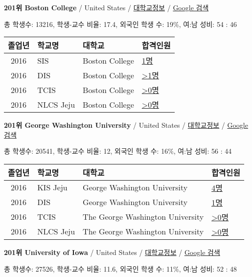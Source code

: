 \documentclass[13pt,]{article}
\begin{document}
\textbf{201위 Boston College} / United States /
\href{https://www.timeshighereducation.com/world-university-rankings/boston-college?ranking-dataset=589595}{대학교정보}
/ \href{http://www.google.com/search?q=Boston+College}{Google 검색}

총 학생수: 13216, 학생-교수 비율: 17.4, 외국인 학생 수: 19\%, 여:남
성비: 54 : 46

\begin{longtable}[]{@{}clll@{}}
\toprule
졸업년 & 학교명 & 대학교 & 합격인원\tabularnewline
\midrule
\endhead
2016 & SIS & Boston College &
\href{http://cafe.naver.com/assarabia/11589}{1명}\tabularnewline
2016 & DIS & Boston College &
\href{http://cafe.naver.com/assarabia/11591}{\textgreater{}1명}\tabularnewline
2016 & TCIS & Boston College &
\href{http://cafe.naver.com/assarabia/11598}{\textgreater{}0명}\tabularnewline
2016 & NLCS Jeju & Boston College &
\href{http://cafe.naver.com/assarabia/11592}{\textgreater{}0명}\tabularnewline
\bottomrule
\end{longtable}

\textbf{201위 George Washington University} / United States /
\href{https://www.timeshighereducation.com/world-university-rankings/george-washington-university?ranking-dataset=589595}{대학교정보}
/
\href{http://www.google.com/search?q=George+Washington+University}{Google
검색}

총 학생수: 20541, 학생-교수 비율: 12, 외국인 학생 수: 16\%, 여:남 성비:
56 : 44

\begin{longtable}[]{@{}clll@{}}
\toprule
졸업년 & 학교명 & 대학교 & 합격인원\tabularnewline
\midrule
\endhead
2016 & KIS Jeju & George Washington University &
\href{http://cafe.naver.com/assarabia/11596}{4명}\tabularnewline
2016 & DIS & George Washington University &
\href{http://cafe.naver.com/assarabia/11591}{1명}\tabularnewline
2016 & TCIS & The George Washington University &
\href{http://cafe.naver.com/assarabia/11598}{\textgreater{}0명}\tabularnewline
2016 & NLCS Jeju & The George Washington University &
\href{http://cafe.naver.com/assarabia/11592}{\textgreater{}0명}\tabularnewline
\bottomrule
\end{longtable}

\textbf{201위 University of Iowa} / United States /
\href{https://www.timeshighereducation.com/world-university-rankings/university-of-iowa?ranking-dataset=589595}{대학교정보}
/ \href{http://www.google.com/search?q=University+of+Iowa}{Google 검색}

총 학생수: 27526, 학생-교수 비율: 11.6, 외국인 학생 수: 11\%, 여:남
성비: 52 : 48
\end{document}
